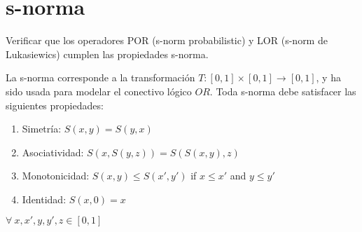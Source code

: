 \documentclass[letterpaper,spanish,11pt]{article}
\begin{document}
\section{s-norma}
Verificar que los operadores POR (s-norm probabilistic) y LOR (s-norm de Lukasiewics) cumplen las propiedades s-norma.

La s-norma corresponde a la transformaci\'{o}n $T:[0,1] \times [0,1]
\rightarrow [0,1]$, y ha sido usada para modelar el conectivo l\'{o}gico $OR$.
Toda s-norma debe satisfacer las siguientes propiedades:

\begin{enumerate}
\item Simetr\'{i}a: $S(x,y)=S(y,x)$
\item Asociatividad: $S(x,S(y,z))=S(S(x,y),z)$
\item Monotonicidad: $S(x,y) \leq S(x',y')$ if $x\leq x'$ and $y\leq y'$
\item Identidad: $S(x,0)=x$
\end{enumerate}
$\forall \ x,x',y,y',z \in [0,1]$
\end{document}
